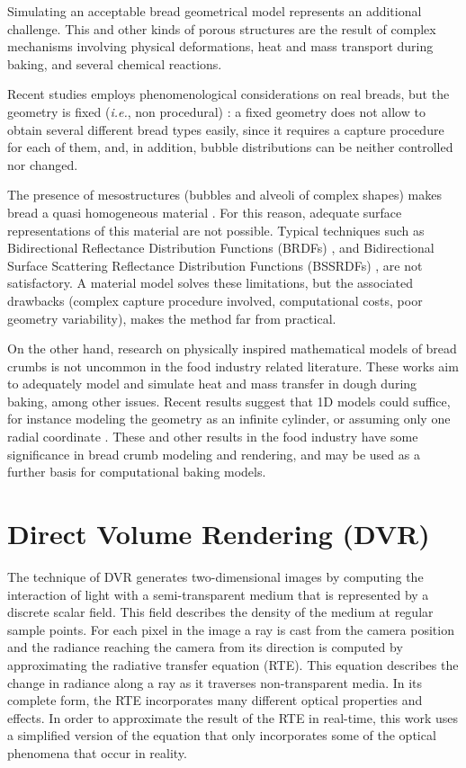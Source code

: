 Simulating an acceptable bread geometrical model represents an additional challenge.
This and other kinds of porous structures are the result of complex mechanisms involving physical deformations, heat and mass transport during baking, and several chemical reactions.

Recent studies employs phenomenological considerations on real breads, but the geometry is fixed ({\em i.e.}, non procedural) \cite{VanDyck2014}: a fixed geometry does not allow to obtain several different bread types easily, since it requires a capture procedure for each of them, and, in addition, bubble distributions can be neither controlled nor changed.

The presence of mesostructures (bubbles and alveoli of complex shapes) makes bread a quasi homogeneous material \cite{Tong2005}. 
For this reason, adequate surface representations of this material are not possible.
Typical techniques such as Bidirectional Reflectance Distribution Functions (BRDFs)
\cite{Kurt2009}, and Bidirectional Surface Scattering Reflectance Distribution Functions (BSSRDFs) \cite{Donner2009}, are not satisfactory.
A material model \cite{Tong2005} solves these limitations, but the associated drawbacks (complex capture procedure involved, computational costs, poor geometry variability),
makes the method far from practical.

On the other hand, research on physically inspired mathematical models of bread crumbs is not uncommon in the food industry related literature.
These works aim to adequately model and simulate heat and mass transfer in dough during baking, among other issues.
Recent results suggest that 1D models could suffice, for instance modeling the geometry as an infinite cylinder, or assuming only one radial coordinate \cite{Purlis2012, Thorvaldsson1999}.
These and other results in the food industry have some significance in bread crumb modeling and rendering, and may be used as a further basis for computational baking models. 


\section{Direct Volume Rendering (DVR)}
The technique of DVR\cite{Kratz2006} generates two-dimensional images by computing the interaction of light with a semi-transparent medium that is represented by a discrete scalar field.
This field describes the density of the medium at regular sample points. 
For each pixel in the image a ray is cast from the camera position and the radiance reaching the camera from its direction is computed by approximating the radiative transfer equation (RTE). This equation describes the change in radiance along a ray as it traverses non-transparent media.
In its complete form, the RTE incorporates many different optical properties and effects. 
In order to approximate the result of the RTE in real-time, this work uses a simplified version of the equation that only incorporates some of the optical phenomena that occur in reality.

